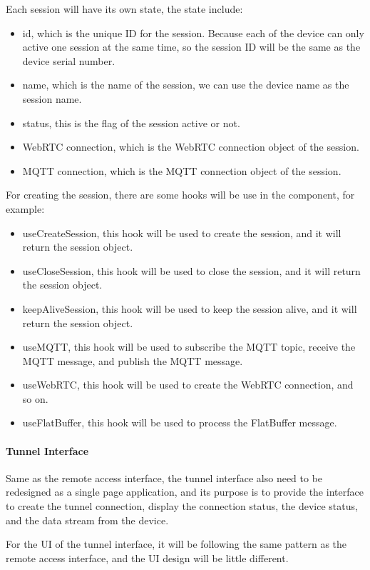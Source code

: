 Each session will have its own state, the state include:
\begin{itemize}
    \item id, which is the unique ID for the session. Because each of the device can only
    active one session at the same time, so the session ID will be the same as the device serial number.
    \item name, which is the name of the session, we can use the device name 
    as the session name.
    \item status, this is the flag of the session active or not.
    \item WebRTC connection, which is the WebRTC connection object of the session.
    \item MQTT connection, which is the MQTT connection object of the session.
\end{itemize}

For creating the session, there are some hooks will be use in the component, for example:
\begin{itemize}
    \item useCreateSession, this hook will be used to create the session, 
    and it will return the session object.
    \item useCloseSession, this hook will be used to close the session, 
    and it will return the session object.
    \item keepAliveSession, this hook will be used to keep the session alive, 
    and it will return the session object.
    \item useMQTT, this hook will be used to subscribe the MQTT topic, receive the MQTT message, 
    and publish the MQTT message.
    \item useWebRTC, this hook will be used to create the WebRTC connection, and so on.
    \item useFlatBuffer, this hook will be used to process the FlatBuffer message.
\end{itemize}

\paragraph{Tunnel Interface}
Same as the remote access interface, the tunnel interface also need to be redesigned  
as a single page application,
and its purpose is to provide the interface to create the tunnel connection, display the connection status,
the device status, and the data stream from the device.

For the UI of the tunnel interface, it will be following the same pattern as the remote access interface,
and the UI design will be little different.

